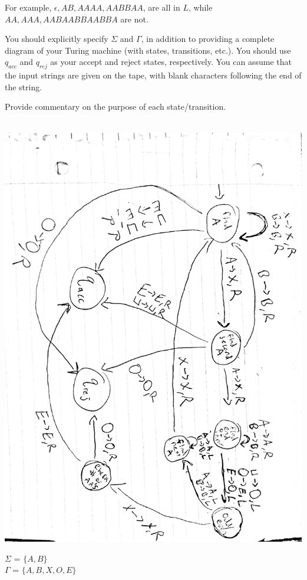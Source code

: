 \documentclass[11pt]{article}
\theoremstyle{definition}
\theoremstyle{theorem}
\newcommand{\solution}{\medskip\noindent{\color{blue}\textbf{Solution:}}}
\begin{document}
For example, $ \epsilon, AB, AAAA, AABBAA$, are all in $L$, while $AA, AAA, AABAABBAABBA$ are not.

You should explicitly specify $\Sigma$ and $\Gamma$, in addition to providing a complete diagram of your Turing machine (with states, transitions, etc.). You should use $q_{acc}$ and $q_{rej}$ as your accept and reject states, respectively. You can assume that the input strings are given on the tape, with blank characters following the end of the string.

Provide commentary on the purpose of each state/transition.

\solution \\

\includegraphics[angle=90,origin=c, scale=0.15]{./hw4p1/hw4p1.jpg}

\noindent$\Sigma$ = $\{A, B \}$ \\
$\Gamma$ = $\{A, B, X, O, E\}$
\end{document}
